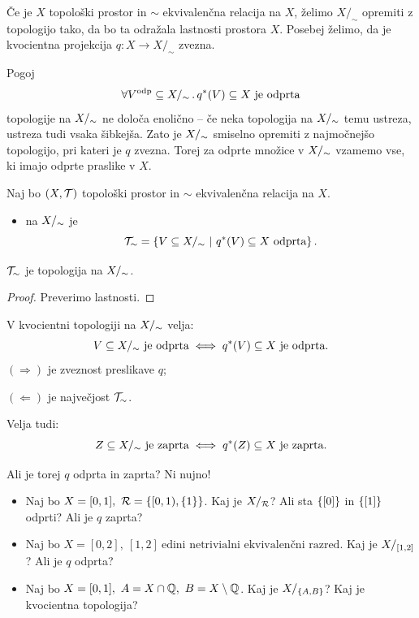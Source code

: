 Če je \(X\) topološki prostor in \(\sim\) ekvivalenčna relacija na \(X\), želimo \(X/_\sim\) opremiti z topologijo tako, da bo ta odražala lastnosti prostora \(X\). Posebej želimo, da je kvocientna projekcija \(q: X \to X/_\sim\) zvezna.

Pogoj \[\forall V^{\text{odp}} \subseteq {X/_\sim} \,.\, q^{*}(V) \subseteq X \ \text{je odprta}\] topologije na \({X/_\sim}\) ne določa enolično -- če neka topologija na \({X/_\sim}\) temu ustreza, ustreza tudi vsaka šibkejša. Zato je \({X/_\sim}\) smiselno opremiti z najmočnejšo topologijo, pri kateri je \(q\) zvezna. Torej za odprte množice v \({X/_\sim}\) vzamemo vse, ki imajo odprte praslike v \(X\).

\begin{definicija}
    Naj bo \((X, \mathcal{T})\) topološki prostor in \(\sim\) ekvivalenčna relacija na \(X\).
    \begin{itemize}
        \item {} na \({X/_\sim}\) je \[\mathcal{T}_\sim = \left\{V \subseteq {X/_\sim} \ | \ q^{*}(V) \subseteq X \ \text{odprta}\right\}.\]
    \end{itemize}
\end{definicija}

\begin{trditev}
    \(\mathcal{T}_\sim\) je topologija na \({X/_\sim}\).
\end{trditev}

\begin{proof}
    Preverimo lastnosti.
\end{proof}

\begin{opomba}
    V kvocientni topologiji na \({X/_\sim}\) velja:
    \[V \subseteq {X/_\sim} \ \text{je odprta} \iff q^{*}(V) \subseteq X \ \text{je odprta}.\]
    \((\Rightarrow)\) je zveznost preslikave \(q\);

    \((\Leftarrow)\) je največjost \(\mathcal{T}_\sim\).

    Velja tudi: 
    \[Z \subseteq \qs{X} \ \text{je zaprta} \liff \invimg{q}(Z) \subseteq X \ \text{je zaprta}.\]
\end{opomba}

\begin{primer}
    Ali je torej \(q\) odprta in zaprta? Ni nujno!
    \begin{itemize}
        \item Naj bo \(X = [0,1], \ \mathcal{R} = \left\{[0, 1), \left\{1\right\}\right\}\). Kaj je \(X/_{\mathcal{R}}\)? Ali sta \(\left\{[0]\right\}\) in \(\left\{[1]\right\}\) odprti? Ali je \(q\) zaprta?
        \item Naj bo \(X = [0,2], \ [1, 2] \ \text{edini netrivialni ekvivalenčni razred}\). Kaj je \(X/_{[1, 2]}\)? Ali je \(q\) odprta?
        \item Naj bo \(X = [0, 1], \ A = X \cap \Q, \ B = X \setminus \Q\). Kaj je \(X/_{\left\{A, B\right\}}\)? Kaj je kvocientna topologija?
    \end{itemize}
\end{primer}

